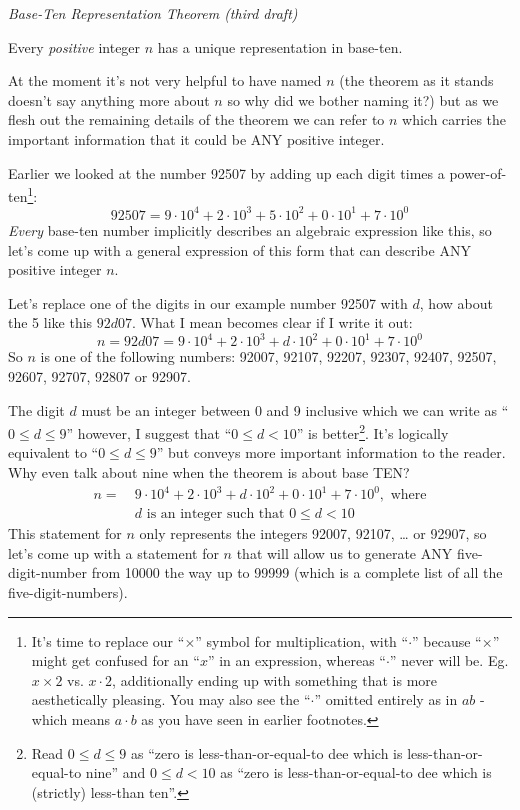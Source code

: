 \documentclass{article}
\newenvironment{jprIn}{\begin{adjustwidth}{2em}{}}{\end{adjustwidth}}
\begin{document}
\emph{Base-Ten Representation Theorem (third draft)}
\begin{jprIn}
Every \emph{positive} integer $n$ has a unique representation in base-ten.
\end{jprIn}

At the moment it's not very helpful to have named $n$ (the theorem as it stands
doesn't say anything more about $n$ so why did we bother naming it?) but
as we flesh out the remaining details of the theorem
we can refer to $n$ which carries the important information that it could be ANY positive integer.

Earlier we looked at the number 92507 by adding up
each digit times a power-of-ten\footnote{It's time
to replace our ``$\times{}$'' symbol for multiplication, with ``$\cdot{}$''
because ``$\times{}$'' might get confused for an ``$x$'' in an expression,
whereas ``$\cdot{}$'' never will be. Eg. $x\times{}2$
vs. $x\cdot{}2$, additionally ending up with something that is more aesthetically pleasing.
You may also see the ``$\cdot$'' omitted entirely as
in $ab$ - which means $a\cdot{}b$ as you have seen in earlier footnotes.}:
\[92507=9{\cdot}10^4+2{\cdot}10^3+5{\cdot}10^2+0{\cdot}10^1+7{\cdot}10^0\]
\emph{Every} base-ten number implicitly describes an algebraic expression like this, so
let's come up
with a general expression of this form that can describe ANY positive integer $n$.

Let's replace one of the digits in our example number 92507 with $d$, how about the 5 like this $92d07$. What I
mean becomes clear if I write it out:
\[n=92d07=9{\cdot}10^4+2{\cdot}10^3+d{\cdot}10^2+0{\cdot}10^1+7{\cdot}10^0\]
So $n$ is one of the following numbers:
92007,
92107,
92207,
92307,
92407,
92507,
92607,
92707,
92807 or
92907.

The digit $d$ must be an integer between 0 and 9 inclusive 
which we can write as ``$0\le{}d\le{}9$'' however, I suggest that ``$0\le{}d<10$'' is better\footnote{Read 
$0\le{}d\le{}9$ as ``zero is less-than-or-equal-to dee which is less-than-or-equal-to nine''
and $0\le{}d<10$ as ``zero is less-than-or-equal-to dee which is (strictly) less-than ten''.}.
It's logically equivalent to ``$0\le{}d\le{}9$''  but conveys more important information
to the reader. Why even talk about nine when the theorem is about base TEN?
\begin{align*}
n =\ &9{\cdot}10^4+2{\cdot}10^3+d{\cdot}10^2+0{\cdot}10^1+7{\cdot}10^0,\text{ where}\\
&d\text{ is an integer such that }0\le{}d<10
\end{align*}
This statement for $n$ only represents the integers 92007, 92107, \dots{} or 92907, so let's come up
with a statement for $n$ that will allow us to generate ANY five-digit-number from 10000 
the way up to 99999 (which is a complete list of all the five-digit-numbers).
\end{document}
